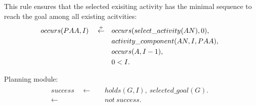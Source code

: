 \documentclass[11pt, oneside]{article}
\begin{document}
This rule ensures that the selected exisiting activity has the minimal sequence to reach the goal among all existing acitvities:
\begin{align}\begin{split}
occurs(PAA,I) \quad \stackrel{\mathclap{\scriptsize\mbox{+}}}{\leftarrow}  \quad 
&occurs(select\_activity(AN),0),\\
&activity\_component(AN,I,PAA),\\
&occurs(A,I-1),\\
&0<I.
\end{split}\end{align}

Planning module:
\begin{align}\begin{split}
success \quad \leftarrow \quad &holds(G,I),\ selected\_goal(G).\\
\leftarrow \quad &not\ success.
\end{split}\end{align}


 
 

%
%
 
 
 
\end{document}
